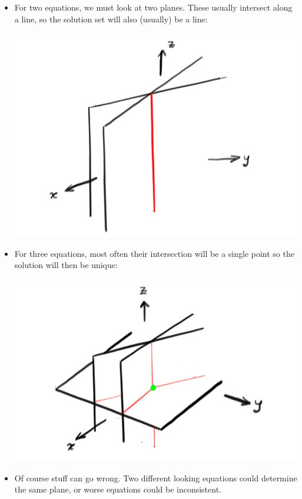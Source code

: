 {\begin{itemize}
\begin{center}
\end{center}
\item For two equations, we must look at two planes. These usually intersect along a line, so the solution set will also (usually) be a line:~\begin{center}
\includegraphics[alt={Two planes in space intersecting in a line.},scale=.18]{two_planes_in_R3.jpg}
\end{center}
\item For three equations, most often their intersection will be a single point so the solution will then be unique:
\begin{center}
\includegraphics[alt={Three planes in space intersecting in a point.},scale=.17]{three_planes_in_R3.jpg}
\end{center}
\item Of course stuff can go wrong. Two different looking equations could determine the same plane, or worse equations could be inconsistent.

\end{itemize}}
